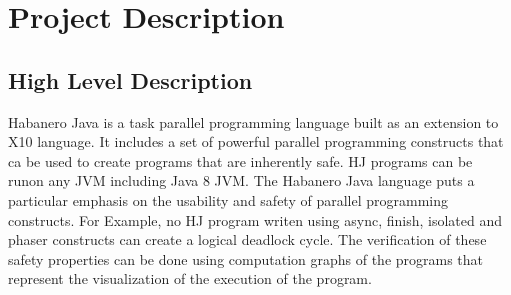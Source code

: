 \section{Project Description}
\subsection{High Level Description}
Habanero Java is a task parallel programming language built as an extension to X10 language. It includes a set of powerful parallel programming constructs that ca be used to create programs that are inherently safe. HJ programs can be runon  any JVM including Java 8 JVM.  The Habanero Java language puts a particular emphasis on the usability and safety of parallel programming constructs. For Example, no HJ program writen using async, finish, isolated and phaser constructs can create a logical deadlock cycle. The verification of these safety properties can be done using computation graphs of the programs that represent the visualization of the execution of the program.

